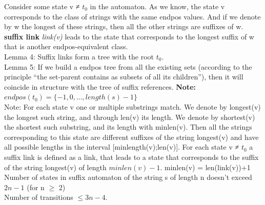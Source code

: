 \documentclass[8pt, a4paper, oneside, twocolumn]{extarticle}
\begin{document}
Consider some state v ≠ $t_0$ in the automaton. As we know, the state v corresponds to the class of strings with the same endpos values. And if we denote by w the longest of these strings, then all the other strings are suffixes of w. \textbf{suffix link} \textit{link(v)} leads to the state that corresponds to the longest suffix of w that is another endpos-equivalent class.\\
Lemma 4: Suffix links form a tree with the root $t_0$.\\
Lemma 5: If we build a endpos tree from all the existing sets (according to the principle “the set-parent contains as subsets of all its children”), then it will coincide in structure with the tree of suffix references. \textbf{Note: }$endpos(t_0) = \{-1, 0, \dots, length(s)-1\}$\\
Note: For each state v one or multiple substrings match. We denote by longest(v) the longest such string, and through len(v) its length. We denote by shortest(v) the shortest such substring, and its length with minlen(v). Then all the strings corresponding to this state are different suffixes of the string longest(v) and have all possible lengths in the interval [minlength(v);len(v)]. For each state v ≠ $t_0$ a suffix link is defined as a link, that leads to a state that corresponds to the suffix of the string longest(v) of length $minlen(v) − 1$. minlen(v) = len(link(v))+1 \\
Number of states in suffix automaton of the string s of length n doesn't exceed $2n - 1$ (for n $\geq$ 2)\\
Number of transitions $\leq 3n - 4$.
\end{document}
